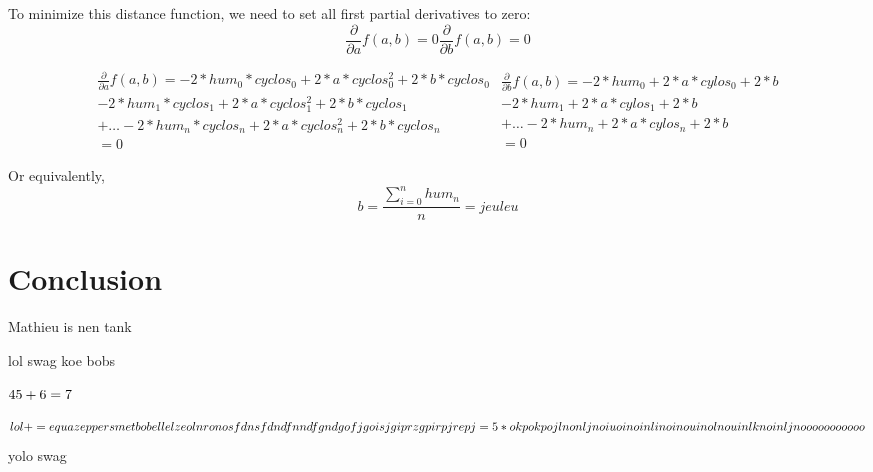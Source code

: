 \documentclass{article}
\begin{document}
To minimize this distance function, we need to set all first partial derivatives to zero: 
\begin{subequations}
	\begin{equation}
		\frac{\partial}{\partial a}f(a,b) = 0 
	\end{equation}
	\begin{equation}
		\frac{\partial}{\partial b}f(a,b) = 0 
	\end{equation}
\end{subequations}

\begin{subequations}
	\begin{equation}
		\begin{split}
		\frac{\partial}{\partial a}f(a,b) = -2*hum_{0}*cyclos_{0} + 2*a*cyclos_{0}^{2} + 2*b*cyclos_{0} \\
		 -2*hum_{1}*cyclos_{1} + 2*a*cyclos_{1}^{2} + 2*b*cyclos_{1} \\
		+ \dots
 		-2*hum_{n}*cyclos_{n} + 2*a*cyclos_{n}^{2} + 2*b*cyclos_{n} \\
		= 0
		\end{split}
	\end{equation}
	\begin{equation}
		\begin{split}
			\frac{\partial}{\partial b}f(a,b) = -2*hum_{0} + 2*a*cylos_{0} + 2*b \\
			-2*hum_{1} + 2*a*cylos_{1} + 2*b \\
			+ \dots
			-2*hum_{n} + 2*a*cylos_{n} + 2*b \\
			= 0
		\end{split}
	\end{equation}
\end{subequations}

Or equivalently,
\begin{subequations}
\begin{equation}
b = \frac{\sum_{i=0}^{n}{hum_{n}}}{n} = jeuleu
\end{equation}
\end{subequations}

\section{Conclusion}
Mathieu is nen tank
\newpage

lol
swag
koe
\newline
bobs

$45 + 6 =  \newline 7$

\begin{equation}
lol += equa \newline
zeppers met bobellel zeoln ron osfdn sfdn dfn ndf gnd gofjgoisjgiprz gpir pjrep j = \hbox{} 5 *okpokpojlnonljnoiuoinoinlinoinouinolnouinlknoinljnooooooooooo
\end{equation}
yolo
\hbox{\hbox{}}
\hbox{\newline \newline }
swag
%
%
\end{document}
